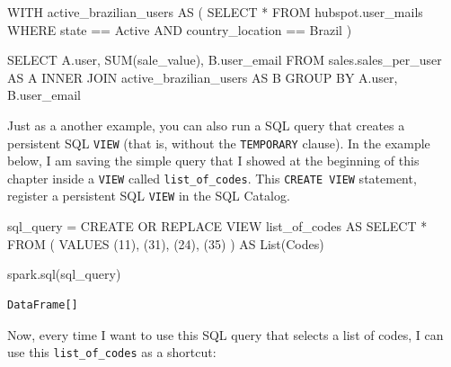 \documentclass[
  11pt,
  letterpaper,
  DIV=11,
  numbers=noendperiod]{scrreprt}
\newenvironment{Shaded}{\begin{snugshade}}{\end{snugshade}}
\newcommand{\FunctionTok}[1]{\textcolor[rgb]{0.28,0.35,0.67}{#1}}
\newcommand{\KeywordTok}[1]{\textcolor[rgb]{0.00,0.23,0.31}{#1}}
\newcommand{\NormalTok}[1]{\textcolor[rgb]{0.00,0.23,0.31}{#1}}
\newcommand{\OperatorTok}[1]{\textcolor[rgb]{0.37,0.37,0.37}{#1}}
\newcommand{\StringTok}[1]{\textcolor[rgb]{0.13,0.47,0.30}{#1}}
\begin{document}
\begin{Shaded}
\begin{Highlighting}[]
\KeywordTok{WITH}\NormalTok{ active\_brazilian\_users }\KeywordTok{AS}\NormalTok{ (}
  \KeywordTok{SELECT} \OperatorTok{*}
  \KeywordTok{FROM}\NormalTok{ hubspot.user\_mails}
  \KeywordTok{WHERE}\NormalTok{ state }\OperatorTok{==} \StringTok{\textquotesingle{}Active\textquotesingle{}}
  \KeywordTok{AND}\NormalTok{ country\_location }\OperatorTok{==} \StringTok{\textquotesingle{}Brazil\textquotesingle{}}
\NormalTok{)}

\KeywordTok{SELECT}\NormalTok{ A.}\FunctionTok{user}\NormalTok{, }\FunctionTok{SUM}\NormalTok{(sale\_value), B.user\_email}
\KeywordTok{FROM}\NormalTok{ sales.sales\_per\_user }\KeywordTok{AS}\NormalTok{ A}
\KeywordTok{INNER} \KeywordTok{JOIN}\NormalTok{ active\_brazilian\_users }\KeywordTok{AS}\NormalTok{ B}
\KeywordTok{GROUP} \KeywordTok{BY}\NormalTok{ A.}\FunctionTok{user}\NormalTok{, B.user\_email}
\end{Highlighting}
\end{Shaded}

Just as a another example, you can also run a SQL query that creates a
persistent SQL \texttt{VIEW} (that is, without the \texttt{TEMPORARY}
clause). In the example below, I am saving the simple query that I
showed at the beginning of this chapter inside a \texttt{VIEW} called
\texttt{list\_of\_codes}. This \texttt{CREATE\ VIEW} statement, register
a persistent SQL \texttt{VIEW} in the SQL Catalog.

\begin{Shaded}
\begin{Highlighting}[]
\NormalTok{sql\_query }\OperatorTok{=} \StringTok{\textquotesingle{}\textquotesingle{}\textquotesingle{}}
\StringTok{CREATE OR REPLACE VIEW list\_of\_codes AS}
\StringTok{SELECT *}
\StringTok{FROM (}
\StringTok{  VALUES (11), (31), (24), (35)}
\StringTok{) AS List(Codes)}
\StringTok{\textquotesingle{}\textquotesingle{}\textquotesingle{}}

\NormalTok{spark.sql(sql\_query)}
\end{Highlighting}
\end{Shaded}

\begin{verbatim}
DataFrame[]
\end{verbatim}

Now, every time I want to use this SQL query that selects a list of
codes, I can use this \texttt{list\_of\_codes} as a shortcut:
\end{document}
